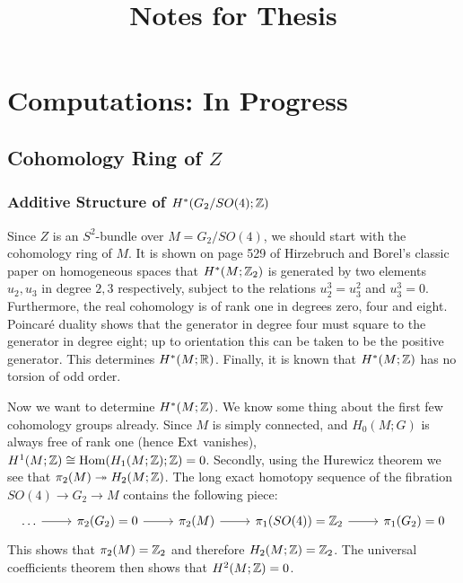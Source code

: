 \documentclass{scrartcl}
\title{Notes for Thesis}
\author{}
\date{}
\begin{document}
\maketitle
\tableofcontents

\section{Computations: In Progress}

\subsection{Cohomology Ring of $Z$}

\subsubsection{Additive Structure of \texorpdfstring{$H^*(G_2/SO(4);\mathbb{Z})$}{the Integral Cohomology of G2 over SO(4)}}

Since $Z$ is an $S^2$-bundle over $M=G_2/SO(4)$, we should start with the cohomology ring of $M$. It is shown on page 529 of Hirzebruch and Borel's classic paper on homogeneous spaces that $H^*(M;\mathbb{Z}_2)$ is generated by two elements $u_2,u_3$ in degree $2,3$ respectively, subject to the relations $u_2^3=u_3^2$ and $u_3^3=0$. Furthermore, the real cohomology is of rank one in degrees zero, four and eight. Poincar\'e duality shows that the generator in degree four must square to the generator in degree eight; up to orientation this can be taken to be the positive generator. This determines $H^*(M;\mathbb{R})$. Finally, it is known that $H^*(M;\mathbb{Z})$ has no torsion of odd order.

\medskip

Now we want to determine $H^*(M;\mathbb{Z})$. We know some thing about the first few cohomology groups already. Since $M$ is simply connected, and $H_0(M;G)$ is always free of rank one (hence $\operatorname{Ext}$ vanishes), $H^1(M;\mathbb{Z})\cong \operatorname{Hom}(H_1(M;\mathbb{Z});\mathbb{Z})=0$. Secondly, using the Hurewicz theorem we see that $\pi_2(M)\twoheadrightarrow H_2(M;\mathbb{Z})$. The long exact homotopy sequence of the fibration $SO(4)\to G_2\to M$ contains the following piece:
\begin{equation*}
	\begin{tikzcd}
		\dots \ar[r] & \pi_2(G_2)=0 \ar[r] & \pi_2(M) \ar[r] & \pi_1(SO(4))=\Z_2 \ar[r] & \pi_1(G_2)=0
	\end{tikzcd}
\end{equation*}
This shows that $\pi_2(M)=\mathbb{Z}_2$ and therefore $H_2(M;\mathbb{Z})=\mathbb{Z}_2$. The universal coefficients theorem then shows that $H^2(M;\mathbb{Z})=0$. 
\end{document}
